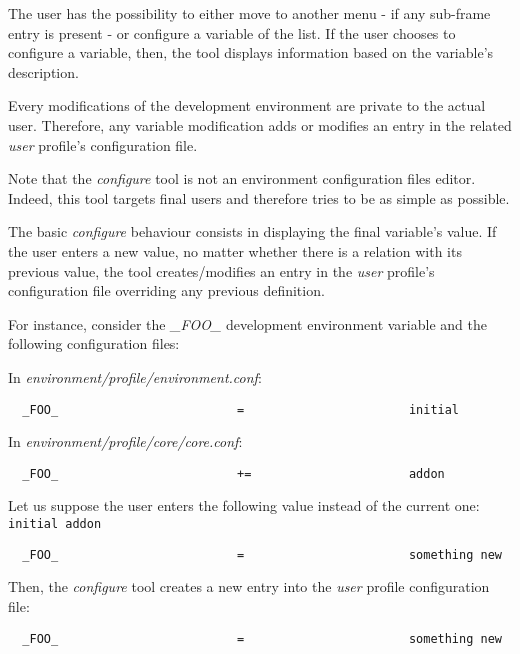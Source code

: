 The user has the possibility to either move to another menu - if any sub-frame
entry is present - or configure a variable of the list. If the user chooses
to configure a variable, then, the tool displays information based on the
variable's description.

Every modifications of the development environment are private to the actual
user. Therefore, any variable modification adds or modifies an entry in the
related \textit{user} profile's configuration file.

Note that the \textit{configure} tool is not an environment configuration
files editor. Indeed, this tool targets final users and therefore tries to
be as simple as possible.

The basic \textit{configure} behaviour consists in displaying the final
variable's value. If the user enters a new value, no matter whether there is
a relation with its previous value, the tool creates/modifies an entry in the
\textit{user} profile's configuration file overriding any previous definition.

For instance, consider the \textit{\_FOO\_} development environment variable
and the following configuration files:

In \textit{environment/profile/environment.conf}:

\begin{verbatim}
  _FOO_                         =                       initial
\end{verbatim}

In \textit{environment/profile/core/core.conf}:

\begin{verbatim}
  _FOO_                         +=                      addon
\end{verbatim}

Let us suppose the user enters the following value instead of the current
one: \verb|initial addon|

\begin{verbatim}
  _FOO_                         =                       something new
\end{verbatim}

Then, the \textit{configure} tool creates a new entry into the \textit{user}
profile configuration file:

\begin{verbatim}
  _FOO_                         =                       something new
\end{verbatim}

